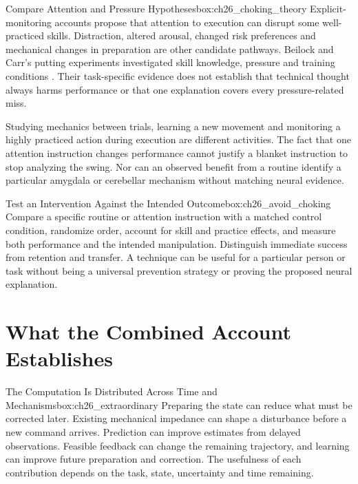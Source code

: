 \begin{principle}{Compare Attention and Pressure Hypotheses}{box:ch26_choking_theory}
Explicit-monitoring accounts propose that attention to execution can disrupt some well-practiced skills. Distraction, altered arousal, changed risk preferences and mechanical changes in preparation are other candidate pathways. Beilock and Carr's putting experiments investigated skill knowledge, pressure and training conditions \citep{Beilock2001Fragility}. Their task-specific evidence does not establish that technical thought always harms performance or that one explanation covers every pressure-related miss.
\end{principle}

Studying mechanics between trials, learning a new movement and monitoring a highly practiced action during execution are different activities. The fact that one attention instruction changes performance cannot justify a blanket instruction to stop analyzing the swing. Nor can an observed benefit from a routine identify a particular amygdala or cerebellar mechanism without matching neural evidence.

\begin{principle}{Test an Intervention Against the Intended Outcome}{box:ch26_avoid_choking}
Compare a specific routine or attention instruction with a matched control condition, randomize order, account for skill and practice effects, and measure both performance and the intended manipulation. Distinguish immediate success from retention and transfer. A technique can be useful for a particular person or task without being a universal prevention strategy or proving the proposed neural explanation.
\end{principle}

\section{What the Combined Account Establishes}
\label{sec:ch26_conclusion}

\begin{principle}{The Computation Is Distributed Across Time and Mechanisms}{box:ch26_extraordinary}
Preparing the state can reduce what must be corrected later. Existing mechanical impedance can shape a disturbance before a new command arrives. Prediction can improve estimates from delayed observations. Feasible feedback can change the remaining trajectory, and learning can improve future preparation and correction. The usefulness of each contribution depends on the task, state, uncertainty and time remaining.
\end{principle}

